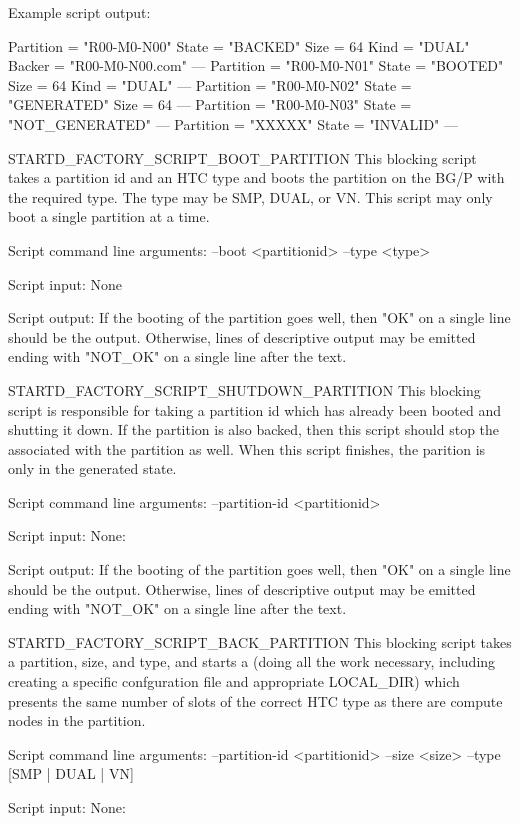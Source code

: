 	Example script output:

		Partition = "R00-M0-N00"
		State = "BACKED"
		Size = 64
		Kind = "DUAL"
		Backer = "R00-M0-N00\@fqdn.com"
		---
		Partition = "R00-M0-N01"
		State = "BOOTED"
		Size = 64
		Kind = "DUAL"
		---
		Partition = "R00-M0-N02"
		State = "GENERATED"
		Size = 64
		---
		Partition = "R00-M0-N03"
		State = "NOT_GENERATED"
		---
		Partition = "XXXXX"
		State = "INVALID"
		---

STARTD_FACTORY_SCRIPT_BOOT_PARTITION
	This blocking script takes a partition id and an HTC type and
	boots the partition on the BG/P with the required type. The type
	may be SMP, DUAL, or VN. This script may only boot a single partition
	at a time.

	Script command line arguments:
		--boot <partitionid> --type <type>
	
	Script input:
		None

	Script output:
		If the booting of the partition goes well, then "OK"
		on a single line should be the output. Otherwise, lines
		of descriptive output may be emitted ending with "NOT_OK"
		on a single line after the text.

STARTD_FACTORY_SCRIPT_SHUTDOWN_PARTITION
	This blocking script is responsible for taking a partition id
	which has already been booted and shutting it down. If the
	partition is also backed, then this script should stop the
	 associated with the partition as well. When this
	script finishes, the parition is only in the generated state.

	Script command line arguments:
		--partition-id <partitionid>
	
	Script input:
		None:
	
	Script output:
		If the booting of the partition goes well, then "OK"
		on a single line should be the output. Otherwise, lines
		of descriptive output may be emitted ending with "NOT_OK"
		on a single line after the text.
		
STARTD_FACTORY_SCRIPT_BACK_PARTITION
	This blocking script takes a partition, size, and type, and
	starts a  (doing all the work necessary, including
	creating a specific confguration file and appropriate LOCAL_DIR)
	which presents the same number of slots of the correct HTC type
	as there are compute nodes in the partition.

	Script command line arguments:
		--partition-id <partitionid> --size <size> --type [SMP | DUAL | VN]
	
	Script input:
		None:
	
